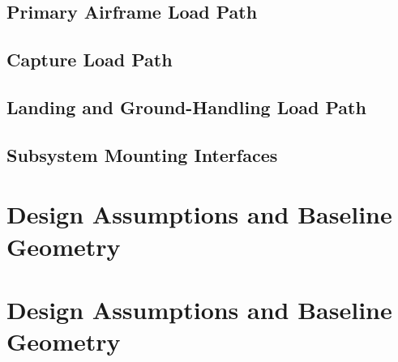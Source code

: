





\subsection{Primary Airframe Load Path}
\subsection{Capture Load Path}
\subsection{Landing and Ground-Handling Load Path}
\subsection{Subsystem Mounting Interfaces}



\section{Design Assumptions and Baseline Geometry}


\section{Design Assumptions and Baseline Geometry}
\label{sec:structural_assumptions_baseline_geometry}

